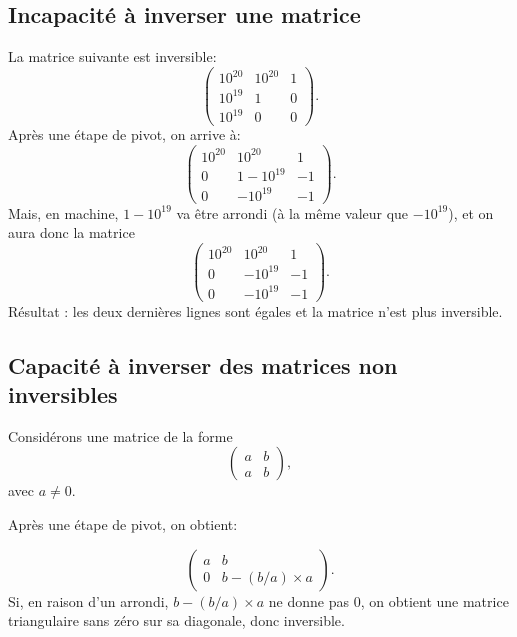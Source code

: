 \subsection{Incapacité à inverser une matrice}
La matrice suivante est inversible:
\begin{equation*}
  \begin{pmatrix}
    10^{20} & 10^{20} & 1\\
    10^{19} & 1 & 0\\
    10^{19} & 0 & 0
  \end{pmatrix}.
\end{equation*}
Après une étape de pivot, on arrive à:
\begin{equation*}
  \begin{pmatrix}
    10^{20} & 10^{20} & 1\\
    0 & 1 - 10^{19} & -1\\
    0 & -10^{19} & -1
  \end{pmatrix}.
\end{equation*}
Mais, en machine, $1-10^{19}$ va être arrondi (à la même valeur que
$-10^{19}$), et on aura donc la matrice 
\begin{equation*}
  \begin{pmatrix}
    10^{20} & 10^{20} & 1\\
    0 &  - 10^{19} & -1\\
    0 & -10^{19} & -1
  \end{pmatrix}.
\end{equation*}
Résultat : les deux dernières lignes sont égales et la matrice n'est
plus inversible.

\subsection{Capacité à inverser des matrices non inversibles}

Considérons une matrice de la forme
\begin{equation*}
  \begin{pmatrix}
    a & b \\
    a & b
  \end{pmatrix},
\end{equation*}
avec $a\neq 0$.

Après une étape de pivot, on obtient:

\begin{equation*}
  \begin{pmatrix}
    a & b \\
    0 & b - (b/a)\times a
  \end{pmatrix}.
\end{equation*}
Si, en raison d'un arrondi, $b - (b/a)\times a$ ne donne pas $0$,
on obtient une matrice triangulaire sans zéro sur sa diagonale, donc
inversible.

